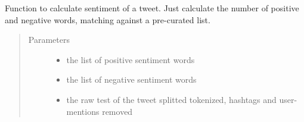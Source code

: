 \documentclass[letterpaper,10pt,english]{sphinxmanual}
\begin{document}
\begin{fulllineitems}
\label{\detokenize{mongoDB_data_ingestion:ingest_raw.calculate_sentiment}}
Function to calculate sentiment of a tweet. Just calculate the number of positive and negative words,
matching against a pre-curated list.
\begin{quote}\begin{description}
\item[{Parameters}] \leavevmode\begin{itemize}
\item {} 
 \textendash{} the list of positive sentiment words

\item {} 
 \textendash{} the list of negative sentiment words

\item {} 
 \textendash{} the raw test of the tweet splitted tokenized, hashtags and user-mentions removed

\end{itemize}

\end{description}\end{quote}

\end{fulllineitems}


\begin{fulllineitems}
\label{\detokenize{mongoDB_data_ingestion:ingest_raw.getDateFromTimestamp}}
\end{fulllineitems}

\end{document}
